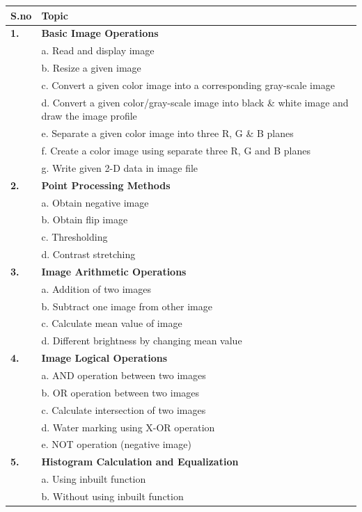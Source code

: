 \documentclass[12pt]{article}
\begin{document}
\renewcommand{\arraystretch}{0.9}
\begin{tabularx}{\textwidth}{|>{\centering\bfseries\large}p{1.5cm}|>{\large}X|}
\hline
\large\bfseries S.no & \centering\large\bfseries Topic \tabularnewline
\hline
1. & \textbf{Basic Image Operations} \\
   & a. Read and display image \\
   & b. Resize a given image \\
   & c. Convert a given color image into a corresponding gray-scale image \\
   & d. Convert a given color/gray-scale image into black \& white image and draw the image profile \\
   & e. Separate a given color image into three R, G \& B planes \\
   & f. Create a color image using separate three R, G and B planes \\
   & g. Write given 2-D data in image file \\
\hline
2. & \textbf{Point Processing Methods} \\
   & a. Obtain negative image \\
   & b. Obtain flip image \\
   & c. Thresholding \\
   & d. Contrast stretching \\
\hline
3. & \textbf{Image Arithmetic Operations} \\
   & a. Addition of two images \\
   & b. Subtract one image from other image \\
   & c. Calculate mean value of image \\
   & d. Different brightness by changing mean value \\
\hline
4. & \textbf{Image Logical Operations} \\
   & a. AND operation between two images \\
   & b. OR operation between two images \\ 
   & c. Calculate intersection of two images \\
   & d. Water marking using X-OR operation \\
   & e. NOT operation (negative image) \\
\hline
5. & \textbf{Histogram Calculation and Equalization} \\
   & a. Using inbuilt function \\
   & b. Without using inbuilt function \\
\hline

\end{tabularx}
\end{document}
